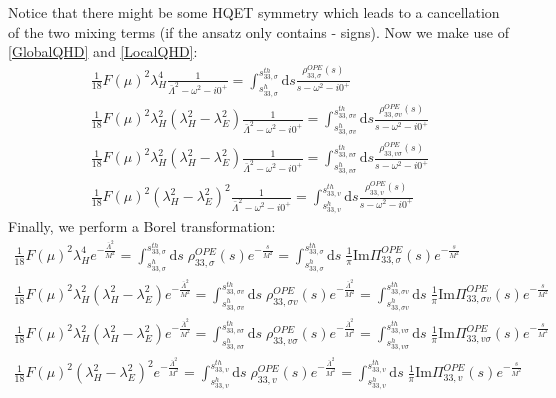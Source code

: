 \documentclass[openright,twoside,12pt,a4paper,final]{article}
\begin{document}
	Notice that there might be some HQET symmetry which leads to a cancellation of the two mixing terms (if the ansatz only contains - signs). Now we make use of \eqref{GlobalQHD} and \eqref{LocalQHD}:
	\begin{align}
		\frac{1}{18} F(\mu)^2 \lambda_H^4 \frac{1}{\bar{\Lambda}^2 - \omega^2 - i0^+} = \int_{s_{33,\sigma}^h}^{s_{33,\sigma}^{th}} \mathrm{d}s \frac{\rho_{33,\sigma}^{OPE}(s)}{s - \omega^2 - i0^+} \\
		\frac{1}{18} F(\mu)^2 \lambda_H^2 (\lambda_H^2 - \lambda_E^2) \frac{1}{\bar{\Lambda}^2 - \omega^2 - i0^+} = \int_{s_{33,\sigma v}^h}^{s_{33,\sigma v}^{th}} \mathrm{d}s \frac{\rho_{33,\sigma v}^{OPE}(s)}{s - \omega^2 - i0^+} \\
		\frac{1}{18} F(\mu)^2 \lambda_H^2 (\lambda_H^2 - \lambda_E^2) \frac{1}{\bar{\Lambda}^2 - \omega^2 - i0^+} = \int_{s_{33,v \sigma}^h}^{s_{33,v \sigma}^{th}} \mathrm{d}s \frac{\rho_{33,v \sigma}^{OPE}(s)}{s - \omega^2 - i0^+} \\
		\frac{1}{18} F(\mu)^2 (\lambda_H^2 - \lambda_E^2)^2 \frac{1}{\bar{\Lambda}^2 - \omega^2 - i0^+} = \int_{s_{33,v}^h}^{s_{33,v}^{th}} \mathrm{d}s \frac{\rho_{33,v}^{OPE}(s)}{s - \omega^2 - i0^+}
	\end{align}
	Finally, we perform a Borel transformation:
	\begin{align}
		\frac{1}{18} F(\mu)^2 \lambda_H^4 e^{-\frac{\bar{\Lambda}^2}{M^2}} = \int_{s_{33,\sigma}^h}^{s_{33,\sigma}^{th}} \mathrm{d}s \;  \rho_{33,\sigma}^{OPE}(s) e^{-\frac{s}{M^2}} = \int_{s_{33,\sigma}^h}^{s_{33,\sigma}^{th}} \mathrm{d}s \; \frac{1}{\pi} \mathrm{Im} \Pi_{33,\sigma}^{OPE}(s) e^{-\frac{s}{M^2}} \\
		\frac{1}{18} F(\mu)^2 \lambda_H^2 (\lambda_H^2 - \lambda_E^2) 	e^{-\frac{\bar{\Lambda}^2}{M^2}} = \int_{s_{33,\sigma v}^h}^{s_{33,\sigma v}^{th}} \mathrm{d}s \;  \rho_{33, \sigma v}^{OPE}(s) e^{-\frac{\bar{\Lambda}^2}{M^2}} = \int_{s_{33,\sigma v}^h}^{s_{33, \sigma v}^{th}} \mathrm{d}s \; \frac{1}{\pi} \mathrm{Im} \Pi_{33, \sigma v}^{OPE}(s) e^{-\frac{s}{M^2}} \\
		\frac{1}{18} F(\mu)^2 \lambda_H^2 (\lambda_H^2 - \lambda_E^2) 	e^{-\frac{\bar{\Lambda}^2}{M^2}} = \int_{s_{33,v \sigma}^h}^{s_{33,v \sigma}^{th}} \mathrm{d}s \;  \rho_{33,v \sigma}^{OPE}(s) e^{-\frac{\bar{\Lambda}^2}{M^2}} = \int_{s_{33,v \sigma}^h}^{s_{33,v \sigma}^{th}} \mathrm{d}s \; \frac{1}{\pi} \mathrm{Im} \Pi_{33,v \sigma}^{OPE}(s) e^{-\frac{s}{M^2}} \\
		\frac{1}{18} F(\mu)^2 (\lambda_H^2 - \lambda_E^2)^2 	e^{-\frac{\bar{\Lambda}^2}{M^2}} = \int_{s_{33,v}^h}^{s_{33, v}^{th}} \mathrm{d}s \;  \rho_{33,v}^{OPE}(s) e^{-\frac{\bar{\Lambda}^2}{M^2}} = \int_{s_{33, v}^h}^{s_{33, v}^{th}} \mathrm{d}s \; \frac{1}{\pi} \mathrm{Im} \Pi_{33, v}^{OPE}(s) e^{-\frac{s}{M^2}} 
	\end{align} \\
	
\end{document}
